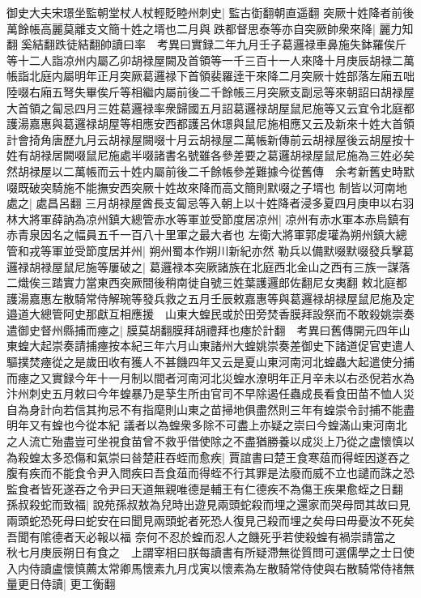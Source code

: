 御史大夫宋璟坐監朝堂杖人杖輕貶睦州刺史|{
	監古衘翻朝直遥翻}
突厥十姓降者前後萬餘帳高麗莫離支文簡十姓之壻也二月與跌都督思泰等亦自突厥帥衆來降|{
	麗力知翻奚結翻跌徒結翻帥讀曰率　考異曰實録二年九月壬子葛邏禄車鼻施失鉢羅俟斤等十二人詣凉州内屬乙卯胡禄屋闕及首領等一千三百十一人來降十月庚辰胡禄二萬帳詣北庭内屬明年正月突厥葛邏禄下首領裴羅逹干來降二月突厥十姓部落左廂五咄陸啜右廂五弩失畢俟斤等相繼内屬前後二千餘帳三月突厥支副忌等來朝詔曰胡禄屋大首領之匐忌四月三姓葛邏禄率衆歸國五月詔葛邏禄胡屋鼠尼施等又云宜令北庭都護湯嘉惠與葛邏禄胡屋等相應安西都護呂休璟與鼠尼施相應又云及新來十姓大首領計會掎角唐歷九月云胡禄屋闕啜十月云胡禄屋二萬帳新傳前云胡禄屋後云胡屋按十姓有胡禄居闕啜鼠尼施處半啜諸書名號雖各參差要之葛邏胡禄屋鼠尼施為三姓必矣然胡禄屋以二萬帳而云十姓内屬前後二千餘帳參差難據今從舊傳　余考新舊史時默啜既破突騎施不能撫安西突厥十姓故來降而高文簡則默啜之子壻也}
制皆以河南地處之|{
	處昌呂翻}
三月胡禄屋酋長支匐忌等入朝上以十姓降者浸多夏四月庚申以右羽林大將軍薛訥為凉州鎮大總管赤水等軍並受節度居凉州|{
	凉州有赤水軍本赤烏鎮有赤青泉因名之幅員五千一百八十里軍之最大者也}
左衛大將軍郭䖍瓘為朔州鎮大總管和戎等軍並受節度居并州|{
	朔州蜀本作朔川新紀亦然}
勒兵以備默啜默啜發兵擊葛邏禄胡禄屋鼠尼施等屢破之|{
	葛邏禄本突厥諸族在北庭西北金山之西有三族一謀落二熾俟三踏實力當東西突厥間後稍南徙自號三姓葉護邏郎佐翻尼女夷翻}
敕北庭都護湯嘉惠左散騎常侍解琬等發兵救之五月壬辰敕嘉惠等與葛邏禄胡禄屋鼠尼施及定邉道大總管阿史那獻互相應援　山東大蝗民或於田旁焚香膜拜設祭而不敢殺姚崇奏遣御史督州縣捕而瘞之|{
	膜莫胡翻膜拜胡禮拜也瘞於計翻　考異曰舊傳開元四年山東蝗大起崇奏請捕瘞按本紀三年六月山東諸州大蝗姚崇奏差御史下諸道促官吏遣人驅撲焚瘞從之是歲田收有獲人不甚饑四年又云是夏山東河南河北蝗蟲大起遣使分捕而瘞之又實録今年十一月制以間者河南河北災蝗水潦明年正月辛未以右丞倪若水為汴州刺史五月敕曰今年蝗暴乃是孶生所由官司不早除遏任蟲成長看食田苗不恤人災自為身計向若信其拘忌不有指麾則山東之苗掃地俱盡然則三年有蝗崇令討捕不能盡明年又有蝗也今從本紀}
議者以為蝗衆多除不可盡上亦疑之崇曰今蝗滿山東河南北之人流亡殆盡豈可坐視食苗曾不救乎借使除之不盡猶勝養以成災上乃從之盧懷慎以為殺蝗太多恐傷和氣崇曰㫺楚莊吞蛭而愈疾|{
	賈誼書曰楚王食寒葅而得蛭因遂吞之腹有疾而不能食令尹入問疾曰吾食葅而得蛭不行其罪是法廢而威不立也譴而誅之恐監食者皆死遂吞之令尹曰天道無親唯德是輔王有仁德疾不為傷王疾果愈蛭之日翻}
孫叔殺蛇而致福|{
	說苑孫叔敖為兒時出遊見兩頭蛇殺而埋之還家而哭母問其故曰見兩頭蛇恐死母曰蛇安在曰聞見兩頭蛇者死恐人復見己殺而埋之矣母曰毋憂汝不死矣吾聞有隂德者天必報以福}
奈何不忍於蝗而忍人之饑死乎若使殺蝗有禍崇請當之　秋七月庚辰朔日有食之　上謂宰相曰朕每讀書有所疑滯無從質問可選儒學之士日使入内侍讀盧懷慎薦太常卿馬懷素九月戊寅以懷素為左散騎常侍使與右散騎常侍禇無量更日侍讀|{
	更工衡翻}
